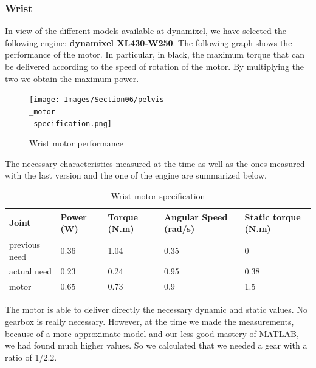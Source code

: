 \subsubsection{Wrist}

In view of the different models available at dynamixel, we have selected the following engine: \textbf{dynamixel XL430-W250}. The following graph shows the performance of the motor. In particular, in black, the maximum torque that can be delivered according to the speed of rotation of the motor. By multiplying the two we obtain the maximum power.
\begin{figure}[ht]
    \centering
    \texttt{[image: Images/Section06/pelvis\\\_motor\\\_specification.png]}
    \caption{Wrist motor performance}
    \label{fig:WristMotor}
\end{figure}
\FloatBarrier

\bigbreak
The necessary characteristics measured at the time as well as the ones measured with the last version and the one of the engine are summarized below.
\begin{table}[ht]
    \centering
    \begin{tabular}{|p{1.5cm} | p{2cm} | p{2.5cm}| p{2.7cm} | p{2.7cm} |} 
        \hline
        \textbf{Joint}& \textbf{Power (W)} & \textbf{Torque (N.m)} & \textbf{Angular Speed (rad/s)} & \textbf{Static torque (N.m)}\\ [0.3ex]
        \hline
        previous need & 0.36 & 1.04 & 0.35 & 0 \\ 
        \hline
        actual need & 0.23 & 0.24 & 0.95 & 0.38 \\ 
        \hline
        motor & 0.65 & 0.73 & 0.9 & 1.5\\ 
        \hline
    \end{tabular}
    \caption{Wrist motor specification}
\end{table}
\FloatBarrier
The motor is able to deliver directly the necessary dynamic and static values. No gearbox is really necessary. However, at the time we made the measurements, because of a more approximate model and our less good mastery of MATLAB, we had found much higher values. So we calculated that we needed a gear with a ratio of 1/2.2.